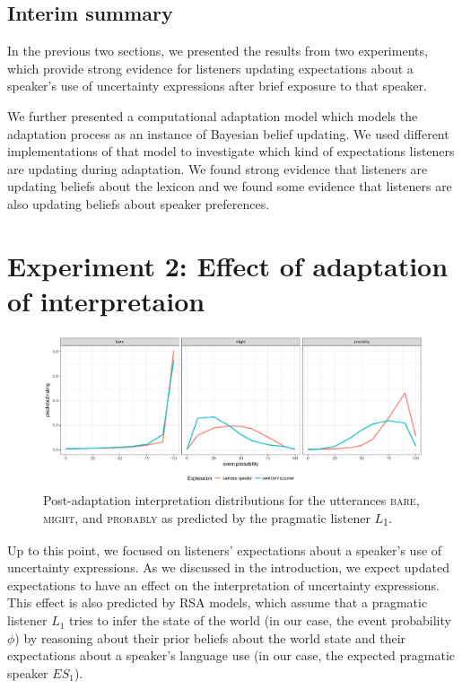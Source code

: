 \documentclass[lucida,biblatex]{sp} %
\begin{document}
\subsection{Interim summary}

In the previous two sections, we presented the results from two experiments, which provide strong evidence for
listeners updating expectations about a speaker's use of uncertainty expressions after brief
exposure to that speaker. 

We further presented a computational adaptation model which models the adaptation
process as an instance of Bayesian belief updating. We used different implementations
of that model to investigate which kind of expectations listeners are updating during adaptation.
We found strong evidence that listeners are updating beliefs about the lexicon and 
we found some evidence that
listeners are also updating beliefs about speaker preferences.

\section{Experiment 2: Effect of adaptation of interpretaion}
\label{sec:exp-model-interpretation}

\begin{figure}
  \includegraphics[width=\textwidth]{plots/adaptation-posterior-comp.pdf}
  \caption{Post-adaptation interpretation distributions for the utterances  \textsc{bare}, \textsc{might}, and \textsc{probably} as predicted by the pragmatic listener $L$\textsubscript{$1$}. \label{fig:post-exposure-comp}}
\end{figure}

Up to this point, we focused on listeners' expectations about a speaker's use of uncertainty expressions. As we discussed
in the introduction, we expect updated expectations to have an effect on the interpretation of uncertainty expressions. This
effect is also predicted by RSA models,  which assume that a pragmatic listener $L_1$ tries to infer the state of the world (in our case, the event probability $\phi$) by reasoning
about their prior beliefs about the world state and their expectations about a speaker's language use (in our case, the expected pragmatic speaker $ES_{1}$).
\end{document}

